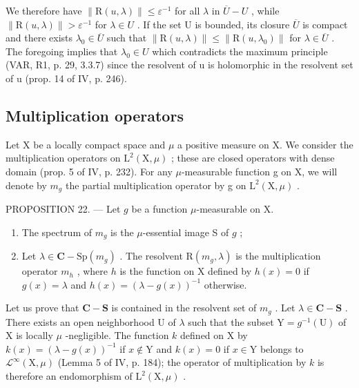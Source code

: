 We therefore have \(\|\mathrm{R}(u,\lambda)\| \leqslant \varepsilon^{-1}\) for all \(\lambda\) in \(\overline{U} - U\) , while \(\|\mathrm{R}(u,\lambda)\| > \varepsilon^{-1}\) for \(\lambda \in U\) . If the set U is bounded, its closure \(\overline{U}\) is compact and there exists \(\lambda_{0} \in \overline{U}\) such that \(\|\mathrm{R}(u,\lambda)\| \leqslant \|\mathrm{R}(u,\lambda_{0})\|\) for \(\lambda \in \overline{U}\) . The foregoing implies that \(\lambda_{0} \in U\) which contradicts the maximum principle (VAR, R1, p. 29, 3.3.7) since the resolvent of u is holomorphic in the resolvent set of u (prop. 14 of IV, p. 246).

\subsection{Multiplication operators}

Let X be a locally compact space and \(\mu\) a positive measure on X. We consider the multiplication operators on \(\mathrm{L}^{2}(\mathrm{X},\mu)\) ; these are closed operators with dense domain (prop. 5 of IV, p. 232). For any \(\mu\)-measurable function g on X, we will denote by \(m_{g}\) the partial multiplication operator by g on \(\mathrm{L}^{2}(\mathrm{X},\mu)\) .

PROPOSITION 22. — Let \(g\) be a function \(\mu\)-measurable on X.

\begin{enumerate}
\def\labelenumi{\alph{enumi})}
\item
  The spectrum of \(m_{g}\) is the \(\mu\)-essential image S of \(g\) ;
\item
  Let \(\lambda \in \mathbf{C} - \mathrm{Sp}(m_g)\) . The resolvent \(\mathrm{R}(m_g, \lambda)\) is the multiplication operator \(m_h\) , where \(h\) is the function on X defined by \(h(x) = 0\) if \(g(x) = \lambda\) and \(h(x) = (\lambda - g(x))^{-1}\) otherwise.
\end{enumerate}

Let us prove that \(\mathbf{C} - \mathbf{S}\) is contained in the resolvent set of \(m_g\) . Let \(\lambda \in \mathbf{C} - \mathbf{S}\) . There exists an open neighborhood U of \(\lambda\) such that the subset \(\mathrm{Y} = g^{-1}(\mathrm{U})\) of X is locally \(\mu\) -negligible. The function \(k\) defined on X by \(k(x) = (\lambda - g(x))^{-1}\) if \(x \notin \mathrm{Y}\) and \(k(x) = 0\) if \(x \in \mathrm{Y}\) belongs to \(\mathcal{L}^{\infty}(\mathrm{X}, \mu)\) (Lemma 5 of IV, p. 184); the operator of multiplication by \(k\) is therefore an endomorphism of \(\mathrm{L}^{2}(\mathrm{X}, \mu)\) .

